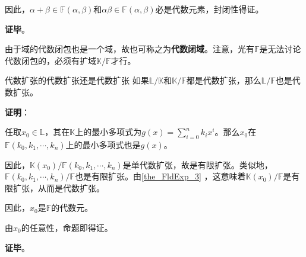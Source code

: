 因此，$\alpha+\beta\in\mathbb{F}(\alpha, \beta)$和$\alpha\beta\in\mathbb{F}(\alpha, \beta)$必是代数元素，封闭性得证。

\textbf{证毕}。


由于域的代数闭包也是一个域，故也可称之为\textbf{代数闭域}。注意，光有$\mathbb{F}$是无法讨论代数闭包的，必须有扩域$\mathbb{K}/\mathbb{F}$才行。


\begin{corollary}{代数扩张的代数扩张还是代数扩张}\label{cor_FldExp_2}
如果$\mathbb{L}/\mathbb{K}$和$\mathbb{K}/\mathbb{F}$都是代数扩张，那么$\mathbb{L}/\mathbb{F}$也是代数扩张。
\end{corollary}

\textbf{证明}：

任取$x_0\in\mathbb{L}$，其在$\mathbb{K}$上的最小多项式为$g(x) = \sum_{i=0}^n k_ix^i$。那么$x_0$在$\mathbb{F}(k_0, k_1, \cdots, k_n)$上的最小多项式也是$g(x)$。

因此，$\mathbb{K}(x_0)/\mathbb{F}(k_0, k_1, \cdots, k_n)$是单代数扩张，故是有限扩张。类似地，$\mathbb{F}(k_0, k_1, \cdots, k_n)/\mathbb{F}$也是有限扩张。由\autoref{the_FldExp_3} ，这意味着$\mathbb{K}(x_0)/\mathbb{F}$是有限扩张，从而是代数扩张。

因此，$x_0$是$\mathbb{F}$的代数元。

由$x_0$的任意性，命题即得证。

\textbf{证毕}。





